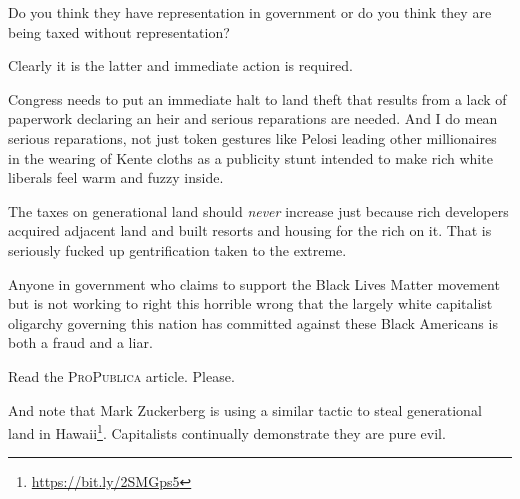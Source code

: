 Do you think they have representation in government or do you think they are being taxed without representation?

Clearly it is the latter and immediate action is required.

Congress needs to put an immediate halt to land theft that results from a lack of paperwork declaring an heir and serious reparations are needed. And I do mean serious reparations, not just token gestures like Pelosi leading other millionaires in the wearing of Kente cloths as a publicity stunt intended to make rich white liberals feel warm and fuzzy inside.

The taxes on generational land should \emph{never} increase just because rich developers acquired adjacent land and built resorts and housing for the rich on it. That is seriously fucked up gentrification taken to the extreme.

Anyone in government who claims to support the Black Lives Matter movement but is not working to right this horrible wrong that the largely white capitalist oligarchy governing this nation has committed against these Black Americans is both a fraud and a liar.

Read the \textsc{ProPublica} article. Please.

And note that Mark Zuckerberg is using a similar tactic to steal generational land in Hawaii\footnote{\url{https://bit.ly/2SMGps5}}. Capitalists continually demonstrate they are pure evil.
